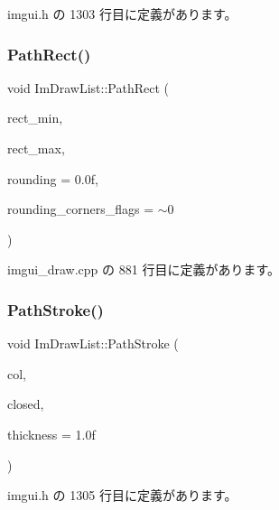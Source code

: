  imgui.\+h の 1303 行目に定義があります。

\mbox{\label{struct_im_draw_list_a1b63e7c7bbb70f8a7be2b227a3d3f802}} 
\subsubsection{\texorpdfstring{Path\+Rect()}{PathRect()}}
{\footnotesize\ttfamily void Im\+Draw\+List\+::\+Path\+Rect (\begin{DoxyParamCaption}\item[{const \mbox{\hyperlink{struct_im_vec2}{Im\+Vec2}} \&}]{rect\+\_\+min,  }\item[{const \mbox{\hyperlink{struct_im_vec2}{Im\+Vec2}} \&}]{rect\+\_\+max,  }\item[{float}]{rounding = {\ttfamily 0.0f},  }\item[{int}]{rounding\+\_\+corners\+\_\+flags = {\ttfamily $\sim$0} }\end{DoxyParamCaption})}



 imgui\+\_\+draw.\+cpp の 881 行目に定義があります。

\mbox{\label{struct_im_draw_list_ac3172e376a4b77915bb22b6d8092b8b2}} 
\subsubsection{\texorpdfstring{Path\+Stroke()}{PathStroke()}}
{\footnotesize\ttfamily void Im\+Draw\+List\+::\+Path\+Stroke (\begin{DoxyParamCaption}\item[{\mbox{\hyperlink{imgui_8h_a118cff4eeb8d00e7d07ce3d6460eed36}{Im\+U32}}}]{col,  }\item[{bool}]{closed,  }\item[{float}]{thickness = {\ttfamily 1.0f} }\end{DoxyParamCaption})\hspace{0.3cm}{\ttfamily [inline]}}



 imgui.\+h の 1305 行目に定義があります。

\mbox{\label{struct_im_draw_list_a44f40c59ca755f559020f5a7fa81103a}} 
